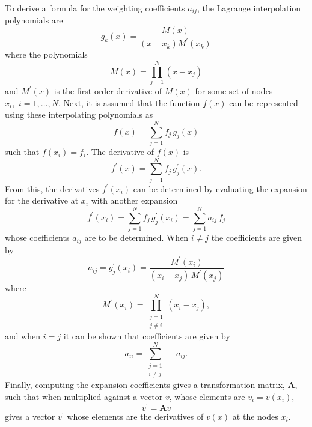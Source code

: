 \documentclass[../main.tex]{subfiles}
\begin{document}
To derive a formula for the weighting coefficients $a_{ij}$, the Lagrange interpolation polynomials are
\begin{equation}
    g_k(x) = \dfrac{M(x)}{(x - x_k) M^{\prime}(x_k)}
\end{equation}
where the polynomials
\begin{equation}
    M(x) = \prod_{j=1}^N (x - x_j)
\end{equation}
and $M^{\prime}(x)$ is the first order derivative of $M(x)$ for some set of nodes $x_i, \,\, i = 1,\ldots,N$. Next, it is assumed that the function $f(x)$ can be represented using these interpolating polynomials as
\begin{equation}
    f(x) = \sum_{j=1}^N f_j \, g_j(x)
\end{equation}
such that $f(x_i) = f_i$. The derivative of $f(x)$ is
\begin{equation}
    f^{\prime}(x) = \sum_{j=1}^N f_j \, g_j^{\prime}(x).
\end{equation}
From this, the derivatives $f^{\prime}(x_i)$ can be determined by evaluating the expansion for the derivative at $x_i$ with another expansion
\begin{equation}
    f^{\prime}(x_i) = \sum_{j=1}^N f_j \, g_j^{\prime}(x_i) = \sum_{j=1}^N a_{ij} \, f_j
\end{equation}
whose coefficients $a_{ij}$ are to be determined. When $i \neq j$ the coefficients are given by
\begin{equation}
    a_{ij} = g_j^{\prime}(x_i) = \dfrac{M^{\prime}(x_i)}{(x_i - x_j) \, M^{\prime}(x_j)}
\end{equation}
where 
\begin{equation}
    M^{\prime}(x_i) = \prod\limits_{\substack{j = 1 \\ j \neq i}}^N (x_i - x_j),
\end{equation}
and when $i = j$ it can be shown \cite{Shu-2000} that coefficients are given by
\begin{equation}
    a_{ii} = \sum\limits_{\substack{j=1 \\ i \neq j}}^N - a_{ij}.
\end{equation}
Finally, computing the expansion coefficients gives a transformation matrix, $\boldsymbol{A}$, such that when multiplied against a vector $v$, whose elements are $v_i = v(x_i)$,
\begin{equation} \label{eqn:DQ_method}
    v^{\prime} = \boldsymbol{A} v
\end{equation}
gives a vector $v^{\prime}$ whose elements are the derivatives of $v(x)$ at the nodes $x_i$. 
\end{document}
